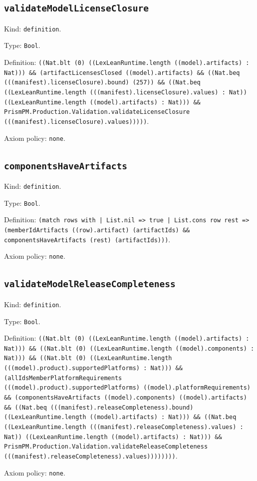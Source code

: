 \documentclass[11pt]{article}
\begin{document}
\subsection*{\texttt{validateModelLicenseClosure}}
\noindent Kind: \texttt{definition}.\par
\noindent Type: \texttt{Bool}.\par
\noindent Definition: \texttt{((Nat.blt (0) ((LexLeanRuntime.length ((model).artifacts) : Nat))) \&\& (artifactLicensesClosed ((model).artifacts) \&\& ((Nat.beq (((manifest).licenseClosure).bound) (257)) \&\& ((Nat.beq ((LexLeanRuntime.length (((manifest).licenseClosure).values) : Nat)) ((LexLeanRuntime.length ((model).artifacts) : Nat))) \&\& PrismPM.Production.Validation.validateLicenseClosure (((manifest).licenseClosure).values)))))}.\par
\noindent Axiom policy: \texttt{none}.\par
\subsection*{\texttt{componentsHaveArtifacts}}
\noindent Kind: \texttt{definition}.\par
\noindent Type: \texttt{Bool}.\par
\noindent Definition: \texttt{(match rows with | List.nil => true | List.cons row rest => (memberIdArtifacts ((row).artifact) (artifactIds) \&\& componentsHaveArtifacts (rest) (artifactIds)))}.\par
\noindent Axiom policy: \texttt{none}.\par
\subsection*{\texttt{validateModelReleaseCompleteness}}
\noindent Kind: \texttt{definition}.\par
\noindent Type: \texttt{Bool}.\par
\noindent Definition: \texttt{((Nat.blt (0) ((LexLeanRuntime.length ((model).artifacts) : Nat))) \&\& ((Nat.blt (0) ((LexLeanRuntime.length ((model).components) : Nat))) \&\& ((Nat.blt (0) ((LexLeanRuntime.length (((model).product).supportedPlatforms) : Nat))) \&\& (allIdsMemberPlatformRequirements (((model).product).supportedPlatforms) ((model).platformRequirements) \&\& (componentsHaveArtifacts ((model).components) ((model).artifacts) \&\& ((Nat.beq (((manifest).releaseCompleteness).bound) ((LexLeanRuntime.length ((model).artifacts) : Nat))) \&\& ((Nat.beq ((LexLeanRuntime.length (((manifest).releaseCompleteness).values) : Nat)) ((LexLeanRuntime.length ((model).artifacts) : Nat))) \&\& PrismPM.Production.Validation.validateReleaseCompleteness (((manifest).releaseCompleteness).values))))))))}.\par
\noindent Axiom policy: \texttt{none}.\par
\end{document}
